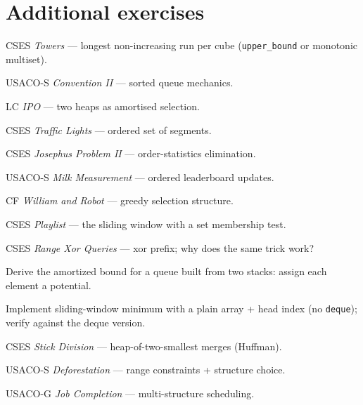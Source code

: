\section{Additional exercises}
\begin{exercise}[easy]
CSES \emph{Towers} --- longest non-increasing run per cube
(\texttt{upper\_bound} or monotonic multiset).
\end{exercise}

\begin{exercise}[easy]
USACO-S \emph{Convention II} --- sorted queue mechanics.
\end{exercise}
\begin{exercise}[easy]
LC \emph{IPO} --- two heaps as amortised selection.
\end{exercise}
\begin{exercise}[medium]
CSES \emph{Traffic Lights} --- ordered set of segments.
\end{exercise}
\begin{exercise}[medium]
CSES \emph{Josephus Problem II} --- order-statistics elimination.
\end{exercise}
\begin{exercise}[medium]
USACO-S \emph{Milk Measurement} --- ordered leaderboard updates.
\end{exercise}
\begin{exercise}[medium]
CF \emph{William and Robot} --- greedy selection structure.
\end{exercise}
\begin{exercise}[easy] CSES \emph{Playlist} --- the sliding window with a set membership test. \end{exercise}
\begin{exercise}[easy] CSES \emph{Range Xor Queries} --- xor prefix; why does the same trick work? \end{exercise}
\begin{exercise}[medium] Derive the amortized bound for a queue built from two stacks: assign each element a potential. \end{exercise}
\begin{exercise}[medium] Implement sliding-window minimum with a plain array + head index (no \texttt{deque}); verify against the deque version. \end{exercise}
\begin{exercise}[hard]
CSES \emph{Stick Division} --- heap-of-two-smallest merges (Huffman).
\end{exercise}
\begin{exercise}[hard]
USACO-S \emph{Deforestation} --- range constraints + structure choice.
\end{exercise}
\begin{exercise}[hard]
USACO-G \emph{Job Completion} --- multi-structure scheduling.
\end{exercise}

